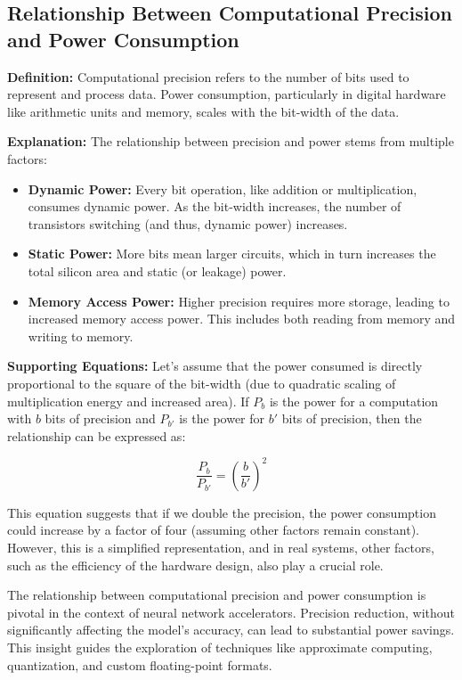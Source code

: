 \subsection{Relationship Between Computational Precision and Power Consumption}

\textbf{Definition:} Computational precision refers to the number of bits used to represent and process data. Power consumption, particularly in digital hardware like arithmetic units and memory, scales with the bit-width of the data.

\textbf{Explanation:} The relationship between precision and power stems from multiple factors:

\begin{itemize}
	\item \textbf{Dynamic Power:} Every bit operation, like addition or multiplication, consumes dynamic power. As the bit-width increases, the number of transistors switching (and thus, dynamic power) increases.
	
	\item \textbf{Static Power:} More bits mean larger circuits, which in turn increases the total silicon area and static (or leakage) power.
	
	\item \textbf{Memory Access Power:} Higher precision requires more storage, leading to increased memory access power. This includes both reading from memory and writing to memory.
\end{itemize}

\textbf{Supporting Equations:}
Let's assume that the power consumed is directly proportional to the square of the bit-width (due to quadratic scaling of multiplication energy and increased area). If \( P_b \) is the power for a computation with \( b \) bits of precision and \( P_{b'} \) is the power for \( b' \) bits of precision, then the relationship can be expressed as:

\begin{equation}
\frac{P_b}{P_{b'}} = \left(\frac{b}{b'}\right)^2
\end{equation}

This equation suggests that if we double the precision, the power consumption could increase by a factor of four (assuming other factors remain constant). However, this is a simplified representation, and in real systems, other factors, such as the efficiency of the hardware design, also play a crucial role.

The relationship between computational precision and power consumption is pivotal in the context of neural network accelerators. Precision reduction, without significantly affecting the model's accuracy, can lead to substantial power savings. This insight guides the exploration of techniques like approximate computing, quantization, and custom floating-point formats.


